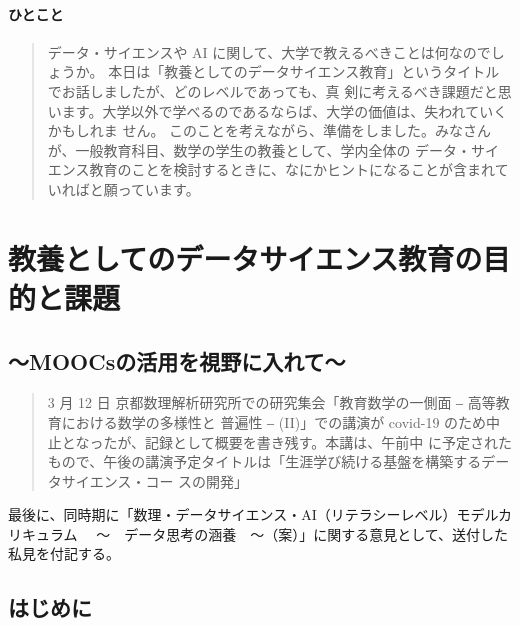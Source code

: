 \documentclass[
]{book}
\theoremstyle{definition}
\theoremstyle{definition}
\theoremstyle{definition}
\theoremstyle{definition}
\theoremstyle{remark}
\begin{document}
\hypertarget{ux3072ux3068ux3053ux3068}{%
\subsubsection{ひとこと}\label{ux3072ux3068ux3053ux3068}}

\begin{quote}
データ・サイエンスや AI に関して、大学で教えるべきことは何なのでしょうか。 本日は「教養としてのデータサイエンス教育」というタイトルでお話しましたが、どのレベルであっても、真
剣に考えるべき課題だと思います。大学以外で学べるのであるならば、大学の価値は、失われていくかもしれま
せん。
このことを考えながら、準備をしました。みなさんが、一般教育科目、数学の学生の教養として、学内全体の データ・サイエンス教育のことを検討するときに、なにかヒントになることが含まれていればと願っています。
\end{quote}

\hypertarget{math2020}{%
\chapter{教養としてのデータサイエンス教育の目的と課題}\label{math2020}}

\hypertarget{moocsux306eux6d3bux7528ux3092ux8996ux91ceux306bux5165ux308cux3066-1}{%
\section*{～MOOCsの活用を視野に入れて～}\label{moocsux306eux6d3bux7528ux3092ux8996ux91ceux306bux5165ux308cux3066-1}}

\begin{quote}
3 月 12 日 京都数理解析研究所での研究集会「教育数学の一側面 ‒ 高等教育における数学の多様性と 普遍性 ‒ (II)」での講演が covid-19 のため中止となったが、記録として概要を書き残す。本講は、午前中 に予定されたもので、午後の講演予定タイトルは「生涯学び続ける基盤を構築するデータサイエンス・コー スの開発」
\end{quote}

最後に、同時期に「数理・データサイエンス・AI（リテラシーレベル）モデルカリキュラム 　～　データ思考の涵養　～（案）」に関する意見として、送付した私見を付記する。

\hypertarget{ux306fux3058ux3081ux306b-2}{%
\section{はじめに}\label{ux306fux3058ux3081ux306b-2}}
\end{document}
